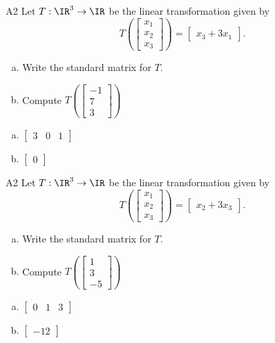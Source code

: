 \begin{problem}{A2}
Let $T: \IR^3 \rightarrow \IR$ be the linear transformation given by $$T\left(\begin{bmatrix} x_1 \\ x_2 \\ x_3  \end{bmatrix} \right) = \begin{bmatrix} x_3+3x_1 \end{bmatrix}.$$
\begin{enumerate}[(a)]
\item Write the standard matrix for $T$.
\item Compute \( T\left( \begin{bmatrix} -1 \\ 7 \\ 3\end{bmatrix} \right) \)
\end{enumerate}
\end{problem}
\begin{solution}
\begin{enumerate}[(a)]
\item \(\begin{bmatrix} 3 & 0 & 1 \end{bmatrix}\)
\item \(\begin{bmatrix} 0 \end{bmatrix}\)
\end{enumerate}
\end{solution}

\begin{problem}{A2}
Let $T: \IR^3 \rightarrow \IR$ be the linear transformation given by $$T\left(\begin{bmatrix} x_1 \\ x_2 \\ x_3  \end{bmatrix} \right) = \begin{bmatrix} x_2+3x_3 \end{bmatrix}.$$
\begin{enumerate}[(a)]
\item Write the standard matrix for $T$.
\item Compute \( T\left( \begin{bmatrix} 1 \\ 3 \\ -5\end{bmatrix} \right) \)
\end{enumerate}
\end{problem}
\begin{solution}
\begin{enumerate}[(a)]
\item \(\begin{bmatrix} 0 & 1 & 3 \end{bmatrix}\)
\item \(\begin{bmatrix} -12 \end{bmatrix}\)
\end{enumerate}
\end{solution}

